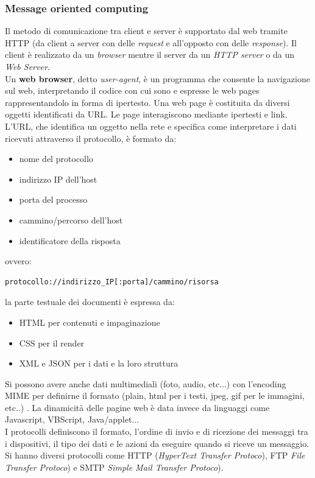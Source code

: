 \documentclass[a4paper,12pt, oneside]{book}
\begin{document}
\subsubsection{Message oriented computing}
Il metodo di comunicazione tra client e server è supportato dal web tramite HTTP (da client a server con delle \textit{request} e all'opposto con delle \textit{response}). Il client è realizzato da un \textit{browser} mentre il server da un \textit{HTTP server} o da un \textit{Web Server}.\\
Un \textbf{web browser}, detto \textit{user-agent}, è un programma che consente la navigazione sul web, interpretando il codice con cui sono e espresse le web pages rappresentandolo in forma di ipertesto. Una web page è costituita da diversi oggetti identificati da URL. Le page interagiscono mediante ipertesti e link.\\
L'URL, che identifica un oggetto nella rete e specifica come interpretare i
dati ricevuti attraverso il protocollo, è formato da:
\begin{itemize}
\item nome del protocollo 
\item indirizzo IP dell'host
\item porta del processo
\item cammino/percorso dell'host
\item identificatore della risposta
\end{itemize}
ovvero: \begin{verbatim}
protocollo://indirizzo_IP[:porta]/cammino/risorsa
\end{verbatim}
la parte testuale dei documenti è espressa da:
\begin{itemize}
\item HTML per contenuti e impaginazione
\item CSS per il render
\item XML e JSON per i dati e la loro struttura
\end{itemize}
Si possono avere anche dati multimediali (foto, audio, etc...) con l'encoding MIME per definirne il formato (plain, html per i testi, jpeg, gif per le immagini, etc..) . La dinamicità delle pagine web è data invece da linguaggi come Javascript, VBScript, Java/applet...\\
I protocolli definiscono il formato, l'ordine di invio e di ricezione dei messaggi tra i dispositivi, il tipo dei dati e le azioni da eseguire quando si riceve un messaggio. Si hanno diversi protocolli come HTTP (\textit{HyperText Transfer Protoco}), FTP \textit{File Transfer Protoco}) e SMTP \textit{Simple Mail Transfer Protoco}).\\
\end{document}

